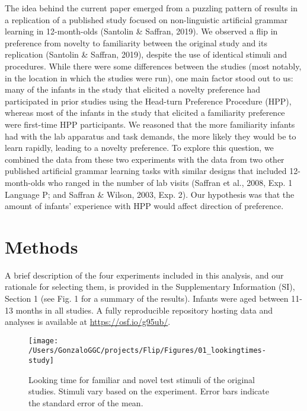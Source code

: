 \documentclass[english,man,man,floatsintext]{apa6}
\begin{document}
The idea behind the current paper emerged from a puzzling pattern of results in a replication of a published study focused on non-linguistic artificial grammar learning in 12-month-olds (Santolin \& Saffran, 2019). We observed a flip in preference from novelty to familiarity between the original study and its replication (Santolin \& Saffran, 2019), despite the use of identical stimuli and procedures. While there were some differences between the studies (most notably, in the location in which the studies were run), one main factor stood out to us: many of the infants in the study that elicited a novelty preference had participated in prior studies using the Head-turn Preference Procedure (HPP), whereas most of the infants in the study that elicited a familiarity preference were first-time HPP participants. We reasoned that the more familiarity infants had with the lab apparatus and task demands, the more likely they would be to learn rapidly, leading to a novelty preference. To explore this question, we combined the data from these two experiments with the data from two other published artificial grammar learning tasks with similar designs that included 12-month-olds who ranged in the number of lab visits (Saffran et al., 2008, Exp. 1 Language P; and Saffran \& Wilson, 2003, Exp. 2). Our hypothesis was that the amount of infants' experience with HPP would affect direction of preference.

\hypertarget{methods}{%
\section{Methods}\label{methods}}

A brief description of the four experiments included in this analysis, and our rationale for selecting them, is provided in the Supplementary Information (SI), Section 1 (see Fig. 1 for a summary of the results). Infants were aged between 11-13 months in all studies. A fully reproducible repository hosting data and analyses is available at \url{https://osf.io/g95ub/}.

\begin{figure}
\texttt{[image: /Users/GonzaloGGC/projects/Flip/Figures/01\_lookingtimes-study]} \caption{Looking time for familiar and novel test stimuli of the original studies. Stimuli vary based on the experiment. Error bars indicate the standard error of the mean.}\label{fig:fig1}
\end{figure}
\end{document}
